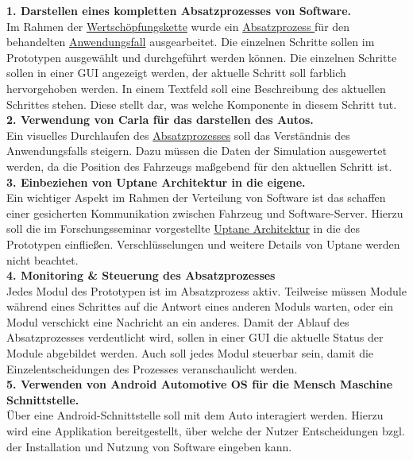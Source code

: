 \textbf{1. Darstellen eines kompletten Absatzprozesses von Software.}\label{tecreq1}\\
Im Rahmen der \hyperref[wsk]{Wertschöpfungskette} wurde ein \hyperref[absatzprozess]{Absatzprozess }für den behandelten \hyperref[anwendungsfall]{Anwendungsfall} ausgearbeitet. Die einzelnen Schritte sollen im Prototypen ausgewählt und durchgeführt werden können. Die einzelnen Schritte sollen in einer GUI angezeigt werden, der aktuelle Schritt soll farblich hervorgehoben werden. In einem Textfeld soll eine Beschreibung des aktuellen Schrittes stehen. Diese stellt dar, was welche Komponente in diesem Schritt tut.\\

\textbf{2. Verwendung von Carla für das darstellen des Autos.}\label{tecreq2}\\
Ein visuelles Durchlaufen des \hyperref[absatzprozess]{Absatzprozesses} soll das Verständnis des Anwendungsfalls steigern. Dazu müssen die Daten der Simulation ausgewertet werden, da die Position des Fahrzeugs maßgebend für den aktuellen Schritt ist.\\

\textbf{3. Einbeziehen von Uptane Architektur in die eigene.}\label{tecreq3}\\
Ein wichtiger Aspekt im Rahmen der Verteilung von Software ist das schaffen einer gesicherten Kommunikation zwischen Fahrzeug und Software-Server. Hierzu soll die im Forschungsseminar vorgestellte \hyperref[uptane]{Uptane Architektur} in die des Prototypen einfließen. Verschlüsselungen und weitere Details von Uptane werden nicht beachtet.\\

\textbf{4. Monitoring \& Steuerung des Absatzprozesses}\label{tecreq4}\\
Jedes Modul des Prototypen ist im Absatzprozess aktiv. Teilweise müssen Module während eines Schrittes auf die Antwort eines anderen Moduls warten, oder ein Modul verschickt eine Nachricht an ein anderes. Damit der Ablauf des Absatzprozesses verdeutlicht wird, sollen in einer GUI die aktuelle Status der Module abgebildet werden. Auch soll jedes Modul steuerbar sein, damit die Einzelentscheidungen des Prozesses veranschaulicht werden.\\

\textbf{5. Verwenden von Android Automotive OS für die Mensch Maschine Schnittstelle.}\label{tecreq5}\\
Über eine Android-Schnittstelle soll mit dem Auto interagiert werden. Hierzu wird eine Applikation bereitgestellt, über welche der Nutzer Entscheidungen bzgl. der Installation und Nutzung von Software eingeben kann.\\ 

